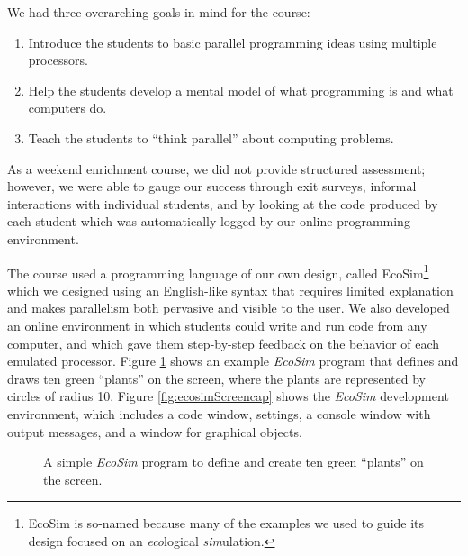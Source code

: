 \documentclass{sig-alternate}
\newcommand{\INDSTATE}[1][1]{\STATE\hspace{#1\algorithmicindent}}
\newcommand{\EcoSim}{EcoSim}
\begin{document}
We had three overarching goals in mind for the course:
\begin{enumerate}
\item Introduce the students to basic parallel programming ideas using multiple processors.
\item Help the students develop a mental model of what programming is and what computers do.
\item Teach the students to ``think parallel'' about computing problems.
\end{enumerate}
As a weekend enrichment course, we did not provide structured assessment;
however, we were able to gauge our success through exit surveys, 
informal interactions with individual students, and by looking at the code produced by each student
which was automatically logged by our online programming environment.

The course used a programming language of our own design, called \EcoSim{}\footnote{
\EcoSim{} is so-named because many of the examples we used to guide its design 
focused on an \emph{eco}logical \emph{sim}ulation.} 
which we designed using an English-like syntax that requires limited explanation 
and makes parallelism both pervasive and visible to the user.
We also developed an online environment in which students could write and run code from any computer,
and which gave them step-by-step feedback on the behavior of each emulated processor.
Figure \ref{fig:exampleProgram} shows an example \emph{EcoSim} program that defines and
draws ten green ``plants'' on the screen, where the plants are represented by circles of radius 10.
Figure \ref{fig:ecosimScreencap} shows the \emph{EcoSim} development environment, which includes
a code window, settings, a console window with output messages, and a window for graphical objects.
\begin{figure}
\begin{algorithmic}[1]
  \INDSTATE{a position}
  \INDSTATE{size, a number}
  \INDSTATE{a color}
\STATE{}
  \INDSTATE{do in order}
  \INDSTATE{replace the plant's color with green}
  \INDSTATE{replace the plant's size with 10}
\end{algorithmic} 
\caption{A simple \emph{EcoSim} program to define and create ten green ``plants'' on the screen.}
\label{fig:exampleProgram} 
\end{figure}
\end{document}
